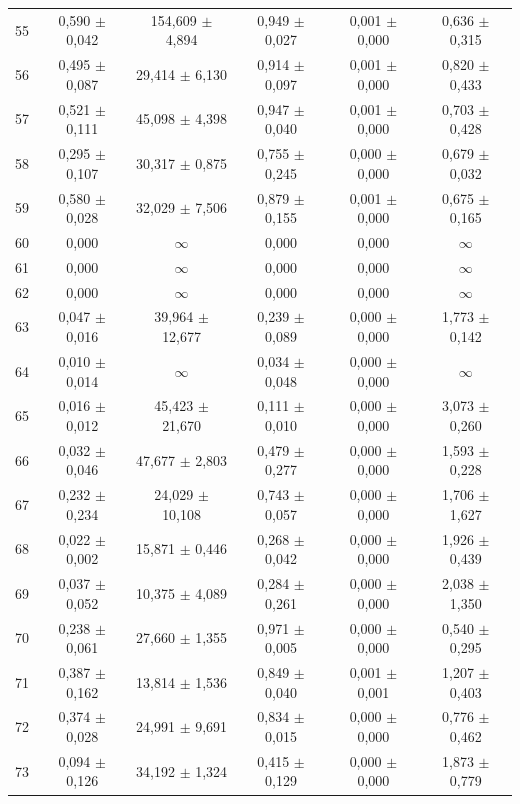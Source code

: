 \begin{tabular}{l c c c c c}
55 & 0,590 $\pm$ 0,042 & 154,609 $\pm$ 4,894 & 0,949 $\pm$ 0,027 & 0,001 $\pm$ 0,000 & 0,636 $\pm$ 0,315 \\
56 & 0,495 $\pm$ 0,087 & 29,414 $\pm$ 6,130 & 0,914 $\pm$ 0,097 & 0,001 $\pm$ 0,000 & 0,820 $\pm$ 0,433 \\
57 & 0,521 $\pm$ 0,111 & 45,098 $\pm$ 4,398 & 0,947 $\pm$ 0,040 & 0,001 $\pm$ 0,000 & 0,703 $\pm$ 0,428 \\
58 & 0,295 $\pm$ 0,107 & 30,317 $\pm$ 0,875 & 0,755 $\pm$ 0,245 & 0,000 $\pm$ 0,000 & 0,679 $\pm$ 0,032 \\
59 & 0,580 $\pm$ 0,028 & 32,029 $\pm$ 7,506 & 0,879 $\pm$ 0,155 & 0,001 $\pm$ 0,000 & 0,675 $\pm$ 0,165 \\
60 & 0,000 & $\infty$ & 0,000 & 0,000 & $\infty$ \\
61 & 0,000 & $\infty$ & 0,000 & 0,000 & $\infty$ \\
62 & 0,000 & $\infty$ & 0,000 & 0,000 & $\infty$ \\
63 & 0,047 $\pm$ 0,016 & 39,964 $\pm$ 12,677 & 0,239 $\pm$ 0,089 & 0,000 $\pm$ 0,000 & 1,773 $\pm$ 0,142 \\
64 & 0,010 $\pm$ 0,014 & $\infty$ & 0,034 $\pm$ 0,048 & 0,000 $\pm$ 0,000 & $\infty$ \\
65 & 0,016 $\pm$ 0,012 & 45,423 $\pm$ 21,670 & 0,111 $\pm$ 0,010 & 0,000 $\pm$ 0,000 & 3,073 $\pm$ 0,260 \\
66 & 0,032 $\pm$ 0,046 & 47,677 $\pm$ 2,803 & 0,479 $\pm$ 0,277 & 0,000 $\pm$ 0,000 & 1,593 $\pm$ 0,228 \\
67 & 0,232 $\pm$ 0,234 & 24,029 $\pm$ 10,108 & 0,743 $\pm$ 0,057 & 0,000 $\pm$ 0,000 & 1,706 $\pm$ 1,627 \\
68 & 0,022 $\pm$ 0,002 & 15,871 $\pm$ 0,446 & 0,268 $\pm$ 0,042 & 0,000 $\pm$ 0,000 & 1,926 $\pm$ 0,439 \\
69 & 0,037 $\pm$ 0,052 & 10,375 $\pm$ 4,089 & 0,284 $\pm$ 0,261 & 0,000 $\pm$ 0,000 & 2,038 $\pm$ 1,350 \\
70 & 0,238 $\pm$ 0,061 & 27,660 $\pm$ 1,355 & 0,971 $\pm$ 0,005 & 0,000 $\pm$ 0,000 & 0,540 $\pm$ 0,295 \\
71 & 0,387 $\pm$ 0,162 & 13,814 $\pm$ 1,536 & 0,849 $\pm$ 0,040 & 0,001 $\pm$ 0,001 & 1,207 $\pm$ 0,403 \\
72 & 0,374 $\pm$ 0,028 & 24,991 $\pm$ 9,691 & 0,834 $\pm$ 0,015 & 0,000 $\pm$ 0,000 & 0,776 $\pm$ 0,462 \\
73 & 0,094 $\pm$ 0,126 & 34,192 $\pm$ 1,324 & 0,415 $\pm$ 0,129 & 0,000 $\pm$ 0,000 & 1,873 $\pm$ 0,779 \\

\end{tabular}
